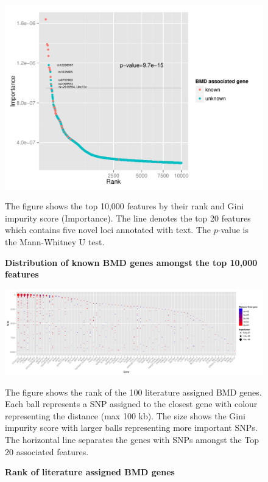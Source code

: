 \documentclass[10pt,letterpaper]{article}
\begin{document}
\begin{figure}[tbhp]
  \begin{adjustwidth}{-1.00in}{0in}
    \caption{\textbf{Distribution of known BMD genes amongst the top 10,000 features}}
    \label{figure:ranksumtest}
    \includegraphics[totalheight=8cm]{./figs/BMDTop10K.pdf}
    \begin{flushleft}
      The figure shows the top 10,000 features by their rank and Gini impurity score (Importance). The line denotes the top 20 features which contains five novel loci annotated with text. The $p$-value is the Mann-Whitney U test.
     \end{flushleft}
  \end{adjustwidth}
\end{figure}


\begin{figure}[tbhp]
  \begin{adjustwidth}{-2.00in}{0in}
    \caption{\textbf{Rank of literature assigned BMD genes}}
    \label{figure:knowngeneranks}
    \includegraphics[totalheight=6.5cm]{./figs/BMDgenes_landscape.pdf}
    \begin{flushleft}
      The figure shows the rank of the 100 literature assigned BMD genes. Each ball represents a SNP assigned to the closest gene with colour representing the distance (max 100 kb). The size shows the Gini impurity score with larger balls representing more important SNPs. The horizontal line separates the genes with SNPs amongst the Top 20 associated features. 
     \end{flushleft}
  \end{adjustwidth}
\end{figure}
\end{document}
